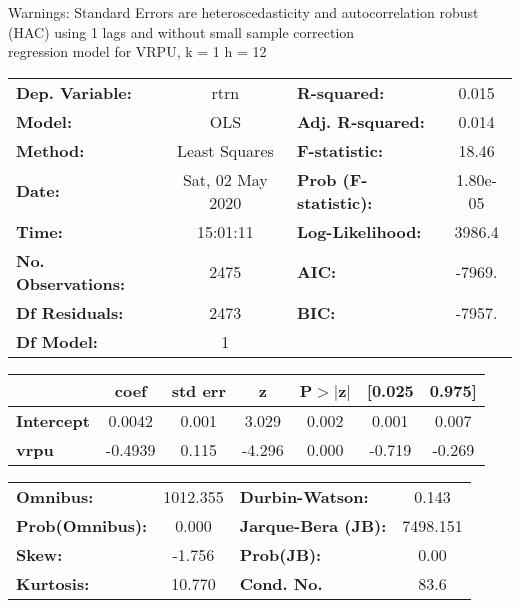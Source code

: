 Warnings: \newline
 [1] Standard Errors are heteroscedasticity and autocorrelation robust (HAC) using 1 lags and without small sample correction\\ 

regression model for VRPU, k = 1 h = 12\begin{center}
\begin{tabular}{lclc}
\toprule
\textbf{Dep. Variable:}    &       rtrn       & \textbf{  R-squared:         } &     0.015   \\
\textbf{Model:}            &       OLS        & \textbf{  Adj. R-squared:    } &     0.014   \\
\textbf{Method:}           &  Least Squares   & \textbf{  F-statistic:       } &     18.46   \\
\textbf{Date:}             & Sat, 02 May 2020 & \textbf{  Prob (F-statistic):} &  1.80e-05   \\
\textbf{Time:}             &     15:01:11     & \textbf{  Log-Likelihood:    } &    3986.4   \\
\textbf{No. Observations:} &        2475      & \textbf{  AIC:               } &    -7969.   \\
\textbf{Df Residuals:}     &        2473      & \textbf{  BIC:               } &    -7957.   \\
\textbf{Df Model:}         &           1      & \textbf{                     } &             \\
\bottomrule
\end{tabular}
\begin{tabular}{lcccccc}
                   & \textbf{coef} & \textbf{std err} & \textbf{z} & \textbf{P$> |$z$|$} & \textbf{[0.025} & \textbf{0.975]}  \\
\midrule
\textbf{Intercept} &       0.0042  &        0.001     &     3.029  &         0.002        &        0.001    &        0.007     \\
\textbf{vrpu}      &      -0.4939  &        0.115     &    -4.296  &         0.000        &       -0.719    &       -0.269     \\
\bottomrule
\end{tabular}
\begin{tabular}{lclc}
\textbf{Omnibus:}       & 1012.355 & \textbf{  Durbin-Watson:     } &    0.143  \\
\textbf{Prob(Omnibus):} &   0.000  & \textbf{  Jarque-Bera (JB):  } & 7498.151  \\
\textbf{Skew:}          &  -1.756  & \textbf{  Prob(JB):          } &     0.00  \\
\textbf{Kurtosis:}      &  10.770  & \textbf{  Cond. No.          } &     83.6  \\
\bottomrule
\end{tabular}
\end{center}

